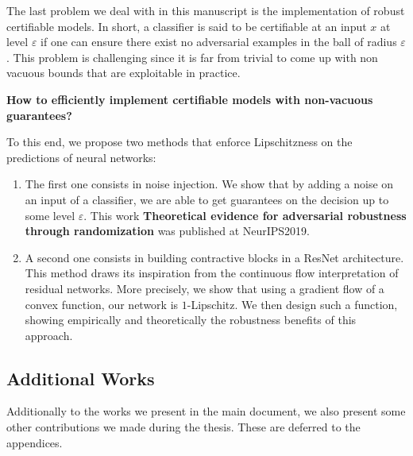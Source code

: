 The last problem we deal with in this manuscript is the implementation of robust certifiable models. In short, a classifier is said to be certifiable at an input $x$ at level $\varepsilon$ if one can ensure there exist no adversarial examples in the ball of radius $\varepsilon$. This problem is challenging since it is far from trivial to come up with non vacuous bounds that are exploitable in practice.
\medskip
\begin{tcolorbox}[colback=grund,colframe=rahmen,title=Question 3]
\textbf{How to efficiently implement certifiable models with non-vacuous guarantees?}
\end{tcolorbox}
\medskip
To this end, we propose two methods that enforce Lipschitzness on the predictions of neural networks:
\begin{enumerate}
    \item The first one consists in noise injection. We show that by adding a noise on an input of a classifier, we are able to get guarantees on the decision up to some level $\varepsilon$. This work \textbf{Theoretical evidence for adversarial robustness through randomization} was published at NeurIPS2019.
    \item A second one consists in building contractive blocks in a ResNet architecture. This method draws its inspiration from the continuous flow interpretation of residual networks. More precisely, we show that using a gradient flow of a convex function, our network is $1$-Lipschitz. We then design such a function, showing empirically and theoretically the robustness benefits of this approach. 

\end{enumerate}

\subsection{Additional Works}
Additionally to the works we present in the main document, we also present some other contributions we made during the thesis. These are deferred to the appendices. 

